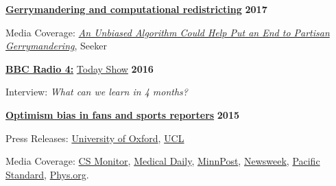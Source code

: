 \documentclass[10pt]{article}
\newenvironment{outerlist}[1][\enskip\textbullet]%
        {\begin{itemize}[#1]}{\end{itemize}%
         \vspace{-.6\baselineskip}}
\newenvironment{innerlist}[1][\enskip\textbullet]%
        {\begin{compactitem}[#1]}{\end{compactitem}}
\begin{document}
\begin{outerlist}
 \item[\textbf{\href{https://dx.doi.org/10.1007/s42001-019-00053-9}{Gerrymandering and computational redistricting}}] \hfill\textbf{2017}
\begin{innerlist}
	\item Media Coverage: \href{https://www.seeker.com/tech/an-unbiased-algorithm-could-help-put-an-end-to-partisan-gerrymandering}{\textit{An Unbiased Algorithm Could Help Put an End to Partisan Gerrymandering}}, Seeker
\end{innerlist}

 \item[\textbf{\href{http://www.bbc.co.uk/radio4}{BBC Radio 4:}} \href{http://www.bbc.co.uk/programmes/b0713zdz}{Today Show}] \hfill\textbf{2016}
\begin{innerlist}
	\item Interview: \textit{What can we learn in 4 months?}
\end{innerlist}

\item[\textbf{\href{http://journals.plos.org/plosone/article?id=10.1371/journal.pone.0137685}{Optimism bias in fans and sports reporters}}] \hfill\textbf{2015}
\begin{innerlist}
  \item Press Releases: \href{http://www.ox.ac.uk/news/2015-09-09-nfl-fans-and-espn-reporters-overly-optimistic-about-team-prospects}{University of Oxford}, \href{https://www.ucl.ac.uk/news/news-articles/0915/100915-nfl-team-prospects}{UCL}
  \item Media Coverage: \href{http://www.csmonitor.com/Science/2015/0909/NFL-scores-Your-team-is-probably-less-invincible-than-you-imagine}{CS Monitor},
  \href{http://www.medicaldaily.com/rose-colored-glasses-nfl-fans-and-sports-reporters-overestimate-how-good-their-teams-351888}{Medical Daily},
  \href{https://www.minnpost.com/second-opinion/2015/09/why-football-fans-are-unrealistically-optimistic-and-why-it-matters}{MinnPost},
  \href{http://europe.newsweek.com/nfl-fans-and-reporters-overly-optimistic-about-teams-prospects-332758}{Newsweek},
  \href{http://www.psmag.com/health-and-behavior/this-study-explains-why-raiders-fans-continue-going-to-watch-their-team-play}{Pacific Standard},
  \href{http://phys.org/news/2015-09-nfl-fans-espn-overly-optimistic.html}{Phys.org}. 
\end{innerlist}
\end{outerlist}
\end{document}
